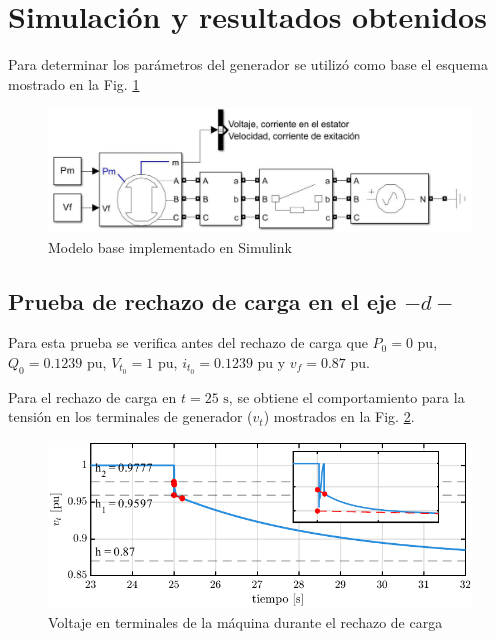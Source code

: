 \documentclass[conference]{IEEEtran}
\begin{document}
\section{Simulación y resultados obtenidos}
Para determinar los parámetros del generador se utilizó como base el esquema mostrado en la Fig. \ref{fig:Modelo_Simulink}

\begin{figure}[H]
    \centering
    \includegraphics[width=\linewidth]{Fig/Modelo_Simulink.pdf}
    \caption{Modelo base implementado en Simulink}
    \label{fig:Modelo_Simulink}
\end{figure}

\subsection{Prueba de rechazo de carga en el eje $-d-$}

Para esta prueba se verifica antes del rechazo de carga que $P_0=0\text{ pu}$, $Q_0=0.1239\text{ pu}$,
$V_{t_0}=1\text{ pu}$, $i_{t_0}=0.1239\text{ pu}$ y $v_f=0.87\text{ pu}$.

Para el rechazo de carga en $t=25\text{ s}$, se obtiene el comportamiento para la tensión
en los terminales de generador ($v_t$) mostrados en la Fig. \ref{fig:fig1}.

\begin{figure}[H]
    \centering
    \includegraphics[width=\linewidth]{Fig/fig1.pdf}
    \caption{Voltaje en terminales de la máquina durante el rechazo de carga}
    \label{fig:fig1}
\end{figure}
\end{document}
